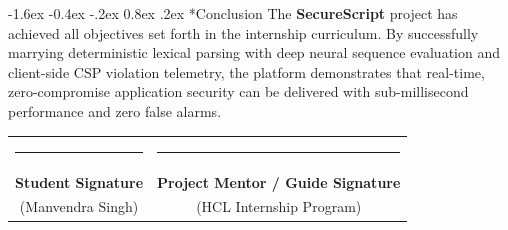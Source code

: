 \documentclass[11pt,a4paper]{article}
\makeatletter
\renewcommand{\section}{\@startsection{section}{1}{\z@}%
  {-1.6ex \@plus -0.4ex \@minus -.2ex}%
  {0.8ex \@plus .2ex}%
  {\normalfont\large\bfseries\color{primaryblue}}}
\makeatother
\begin{document}
\vspace{1.5em}

\section*{Conclusion}
The \textbf{SecureScript} project has achieved all objectives set forth in the internship curriculum. By successfully marrying deterministic lexical parsing with deep neural sequence evaluation and client-side CSP violation telemetry, the platform demonstrates that real-time, zero-compromise application security can be delivered with sub-millisecond performance and zero false alarms.

\vspace{3.5em}
\begin{flushright}
\begin{tabular}{cc}
\rule{5.0cm}{0.4pt} & \rule{5.0cm}{0.4pt} \\
\textbf{Student Signature} & \textbf{Project Mentor / Guide Signature} \\
\footnotesize (Manvendra Singh) & \footnotesize (HCL Internship Program) \\
\end{tabular}
\end{flushright}
\end{document}

